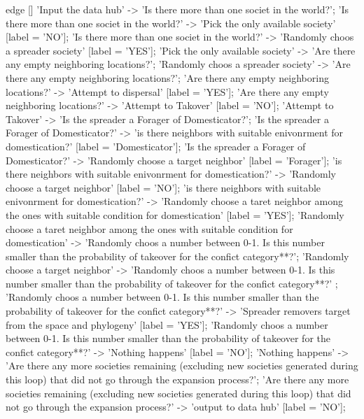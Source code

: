\documentclass[]{book}
\newenvironment{Shaded}{\begin{snugshade}}{\end{snugshade}}
\newcommand{\StringTok}[1]{\textcolor[rgb]{0.31,0.60,0.02}{{#1}}}
\theoremstyle{definition}
\theoremstyle{definition}
\theoremstyle{remark}
\begin{document}
\begin{Shaded}
\begin{Highlighting}[]
\StringTok{    edge []}
\StringTok{    'Input the data hub' -> 'Is there more than one societ in the world?';}
\StringTok{    'Is there more than one societ in the world?' -> 'Pick the only available society' [label = 'NO'];}
\StringTok{    'Is there more than one societ in the world?' -> 'Randomly choos a spreader society' [label = 'YES'];}
\StringTok{    'Pick the only available society' -> 'Are there any empty neighboring locations?';}
\StringTok{    'Randomly choos a spreader society' -> 'Are there any empty neighboring locations?';}
\StringTok{    'Are there any empty neighboring locations?' -> 'Attempt to dispersal' [label = 'YES'];}
\StringTok{    'Are there any empty neighboring locations?' -> 'Attempt to Takover' [label = 'NO'];}
\StringTok{    'Attempt to Takover' -> 'Is the spreader a Forager of Domesticator?';}
\StringTok{    'Is the spreader a Forager of Domesticator?' -> 'is there neighbors with suitable enivonrment for domestication?' [label = 'Domesticator'];}
\StringTok{    'Is the spreader a Forager of Domesticator?' -> 'Randomly choose a target neighbor' [label = 'Forager'];}
\StringTok{    'is there neighbors with suitable enivonrment for domestication?' -> 'Randomly choose a target neighbor' [label = 'NO'];}
\StringTok{    'is there neighbors with suitable enivonrment for domestication?' -> 'Randomly choose a taret neighbor among the ones with suitable condition for domestication' [label = 'YES'];}
\StringTok{    'Randomly choose a taret neighbor among the ones with suitable condition for domestication' -> 'Randomly choos a number between 0-1. Is this number smaller than the probability of takeover for the confict category**?';}
\StringTok{    'Randomly choose a target neighbor'  -> 'Randomly choos a number between 0-1. Is this number smaller than the probability of takeover for the confict category**?' ;}
\StringTok{    'Randomly choos a number between 0-1. Is this number smaller than the probability of takeover for the confict category**?' -> 'Spreader removers target from the space and phylogeny' [label = 'YES'];}
\StringTok{    'Randomly choos a number between 0-1. Is this number smaller than the probability of takeover for the confict category**?' -> 'Nothing happens' [label = 'NO'];}
\StringTok{    'Nothing happens' -> 'Are there any more societies remaining (excluding new societies generated during this loop) that did not go through the expansion process?';}
\StringTok{    'Are there any more societies remaining (excluding new societies generated during this loop) that did not go through the expansion process?' ->  'output to data hub' [label = 'NO'];}

\end{Highlighting}
\end{Shaded}
\end{document}
